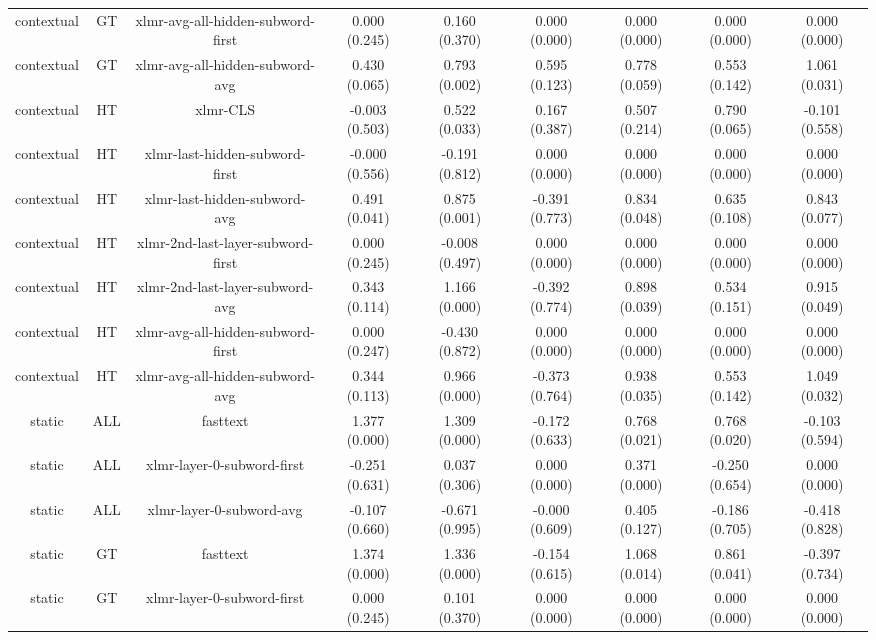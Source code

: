 \begin{sidewaystable}[htb]
\begin{tabular}{@{}ccccccccc@{}}
        contextual & GT & xlmr-avg-all-hidden-subword-first & 0.000 (0.245) & 0.160 (0.370) & 0.000 (0.000) & 0.000 (0.000) & 0.000 (0.000) & 0.000 (0.000) \\
        contextual & GT & xlmr-avg-all-hidden-subword-avg & 0.430 (0.065) & 0.793 (0.002) & 0.595 (0.123) & 0.778 (0.059) & 0.553 (0.142) & 1.061 (0.031) \\
        contextual & HT & xlmr-CLS & -0.003 (0.503) & 0.522 (0.033) & 0.167 (0.387) & 0.507 (0.214) & 0.790 (0.065) & -0.101 (0.558) \\
        contextual & HT & xlmr-last-hidden-subword-first & -0.000 (0.556) & -0.191 (0.812) & 0.000 (0.000) & 0.000 (0.000) & 0.000 (0.000) & 0.000 (0.000) \\
        contextual & HT & xlmr-last-hidden-subword-avg & 0.491 (0.041) & 0.875 (0.001) & -0.391 (0.773) & 0.834 (0.048) & 0.635 (0.108) & 0.843 (0.077) \\
        contextual & HT & xlmr-2nd-last-layer-subword-first & 0.000 (0.245) & -0.008 (0.497) & 0.000 (0.000) & 0.000 (0.000) & 0.000 (0.000) & 0.000 (0.000) \\
        contextual & HT & xlmr-2nd-last-layer-subword-avg & 0.343 (0.114) & 1.166 (0.000) & -0.392 (0.774) & 0.898 (0.039) & 0.534 (0.151) & 0.915 (0.049) \\
        contextual & HT & xlmr-avg-all-hidden-subword-first & 0.000 (0.247) & -0.430 (0.872) & 0.000 (0.000) & 0.000 (0.000) & 0.000 (0.000) & 0.000 (0.000) \\
        contextual & HT & xlmr-avg-all-hidden-subword-avg & 0.344 (0.113) & 0.966 (0.000) & -0.373 (0.764) & 0.938 (0.035) & 0.553 (0.142) & 1.049 (0.032) \\
        static & ALL & fasttext & 1.377 (0.000) & 1.309 (0.000) & -0.172 (0.633) & 0.768 (0.021) & 0.768 (0.020) & -0.103 (0.594) \\
        static & ALL & xlmr-layer-0-subword-first & -0.251 (0.631) & 0.037 (0.306) & 0.000 (0.000) & 0.371 (0.000) & -0.250 (0.654) & 0.000 (0.000) \\
        static & ALL & xlmr-layer-0-subword-avg & -0.107 (0.660) & -0.671 (0.995) & -0.000 (0.609) & 0.405 (0.127) & -0.186 (0.705) & -0.418 (0.828) \\
        static & GT & fasttext & 1.374 (0.000) & 1.336 (0.000) & -0.154 (0.615) & 1.068 (0.014) & 0.861 (0.041) & -0.397 (0.734) \\
        static & GT & xlmr-layer-0-subword-first & 0.000 (0.245) & 0.101 (0.370) & 0.000 (0.000) & 0.000 (0.000) & 0.000 (0.000) & 0.000 (0.000) \\

\end{tabular}
\end{sidewaystable}
